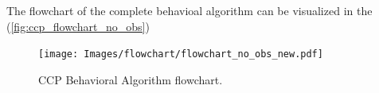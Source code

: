 The flowchart of the complete behavioal algorithm can be visualized in the (\autoref{fig:ccp_flowchart_no_obs})


\begin{figure}[H]
    \centering
    \texttt{[image: Images/flowchart/flowchart\_no\_obs\_new.pdf]}
    \caption{CCP Behavioral Algorithm flowchart.}
    \label{fig:ccp_flowchart_no_obs}
\end{figure}